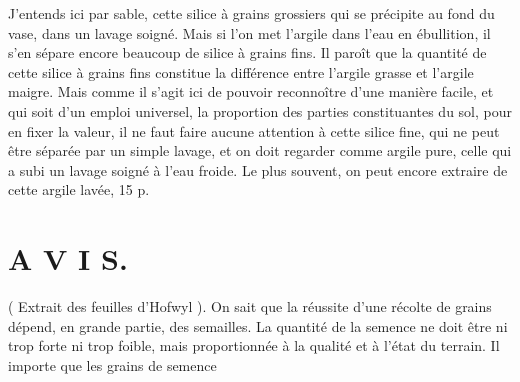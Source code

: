 J'entends ici par sable, cette silice à grains grossiers qui se précipite au fond du vase, dans un lavage soigné. Mais si l'on met l'argile dans l'eau en ébullition, il s'en sépare encore beaucoup de silice à grains fins. Il paroît que la quantité de cette silice à grains fins constitue la différence entre l'argile grasse et l'argile maigre. Mais comme il s'agit ici de pouvoir reconnoître d'une manière facile, et qui soit d'un emploi universel, la proportion des parties constituantes du sol, pour en fixer la valeur, il ne faut faire aucune\setcounter{page}{112} attention à cette silice fine, qui ne peut être séparée par un simple lavage, et on doit regarder comme argile pure, celle qui a subi un lavage soigné à l'eau froide. Le plus souvent, on peut encore extraire de cette argile lavée, 15 p. %
\section{A V I S.}
( Extrait des feuilles d'Hofwyl ).
On sait que la réussite d'une récolte de grains dépend, en grande partie, des semailles. La quantité de la semence ne doit être ni trop forte ni trop foible, mais proportionnée à la qualité et à l'état du terrain. Il importe que les grains de semence